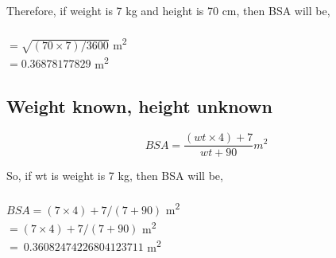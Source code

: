 \documentclass[11pt,a4paper]{report}
\begin{document}
Therefore, if weight is 7 kg and height is 70 cm, then BSA will be, \\\\
$= \sqrt{(70 \times 7) \bigg/ 3600} $ m\textsuperscript{2}\\
$= 0.36878177829 $ m\textsuperscript{2}\\

\subsection{Weight known, height unknown}
\[BSA = {\frac{(wt \times 4) + 7}{wt + 90} } m^2 \]


So, if wt is weight is 7 kg, then BSA will be, \\\\
$BSA = (7 \times 4) + 7 \bigg/ (7 + 90)$ m\textsuperscript{2}\\
$= (7 \times 4) + 7 \bigg/ (7 + 90)$ m\textsuperscript{2}\\
$= ~0.36082474226804123711$ m\textsuperscript{2}


\newpage
\end{document}
